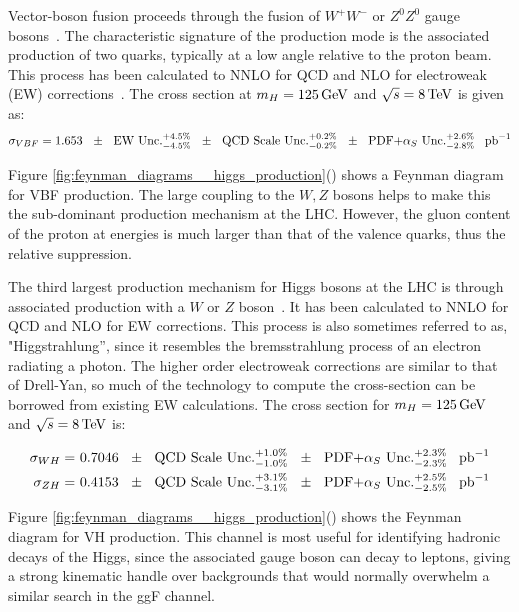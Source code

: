 \par Vector-boson fusion proceeds through the fusion of $W^{+}W^{-}$
or $Z^{0}Z^{0}$  gauge bosons~\cite{th:HiggsXS_2013}. The
characteristic signature of the production mode is the associated
production of two quarks, typically at a low angle relative to the
proton beam.  This process has been calculated to NNLO for QCD and NLO
for electroweak (EW) corrections~\cite{th:HiggsXS_2013}.  The cross section
at $m_{H} = 125\,\text{Ge\hspace{-.08em}V}$ and $\sqrt{s}=8\,\text{Te\hspace{-.08em}V}$ is given as:
\begin{equation}\label{eq:vbf_xs}
\sigma_{VBF} = 1.653~~\pm \text{~~EW Unc.}^{+4.5\%}_{-4.5\%}~~\pm
\text{~~QCD Scale Unc.}^{+0.2\%}_{-0.2\%}~~\pm
\text{~~PDF+$\alpha_{S}$ Unc.}^{+2.6\%}_{-2.8\%}~~\mbox{\ensuremath{\,\text{pb}^\text{$-$1}}} 
\end{equation}

\noindent Figure
\ref{fig:feynman_diagrams__higgs_production}() 
shows a Feynman diagram for VBF production.  The large coupling to the
$W,Z$ bosons helps to make this the sub-dominant production mechanism
at the LHC.  However, the gluon content of the proton at \TeV energies
is much larger than that of the valence quarks, thus the relative
suppression.  

\par The third largest production mechanism for Higgs bosons at the
LHC is through associated production with a $W$ or $Z$
boson~\cite{th:HiggsXS_2013}.  It has been calculated to NNLO for QCD
and NLO for EW corrections. This process is also sometimes
referred to as, "Higgstrahlung'', since it resembles the bremsstrahlung
process of an electron radiating a photon. The higher order
electroweak corrections are similar to that of Drell-Yan, so much
of the technology to compute the cross-section can be borrowed from
existing EW calculations.  The cross section for $m_{H} = 125\,\text{Ge\hspace{-.08em}V}$ and
$\sqrt{s}=8\,\text{Te\hspace{-.08em}V}$ is:  

\begin{equation}\label{eq:vh_xs}
\begin{aligned}
\sigma_{WH} =&~ 0.7046~~\pm \text{~~QCD Scale Unc.}^{+1.0\%}_{-1.0\%}~~\pm
\text{~~PDF+$\alpha_{S}$ Unc.}^{+2.3\%}_{-2.3\%}~~\mbox{\ensuremath{\,\text{pb}^\text{$-$1}}} \\
\sigma_{ZH} =&~ 0.4153~~\pm \text{~~QCD Scale Unc.}^{+3.1\%}_{-3.1\%}~~\pm
\text{~~PDF+$\alpha_{S}$ Unc.}^{+2.5\%}_{-2.5\%}~~\mbox{\ensuremath{\,\text{pb}^\text{$-$1}}} 
\end{aligned}
\end{equation}

\noindent Figure
\ref{fig:feynman_diagrams__higgs_production}()
shows the Feynman diagram for VH production.  This channel is most 
useful for identifying hadronic decays of the Higgs, since the
associated gauge boson can decay to leptons, giving a strong kinematic
handle over backgrounds that would normally overwhelm a similar search
in the ggF channel.  


